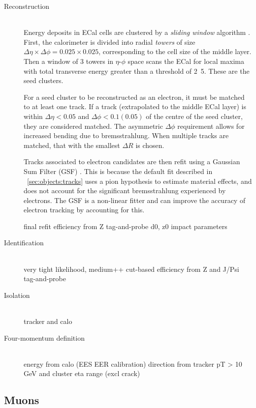 \begin{description}
\item[Reconstruction] \hfill \\
	Energy deposits in \ac{ECal} cells are clustered by a \textit{sliding window} 
	algorithm \cite{ElectronPerf:Expect}. First, the calorimeter is divided into radial 
	\textit{towers} of size $\Delta\eta \times \Delta\phi = 0.025 \times 0.025$, 
	corresponding to the cell size of the middle layer. Then a window of 3  towers
	in $\eta$-$\phi$ space scans the \ac{ECal} for local maxima with total transverse 
	energy greater than a threshold of \unit{2.5}{\GeV}. These are the seed clusters.

	For a seed cluster to be reconstructed as an electron, it must be matched to at least 
	one track. If a track (extrapolated to the middle \ac{ECal} layer) is within 
	$\Delta\eta < 0.05$ and $\Delta\phi < 0.1 (0.05)$ of the centre of the seed cluster, 
	they are considered matched. The asymmetric $\Delta\phi$ requirement allows for 
	increased bending due to bremsstrahlung. When multiple tracks are matched, that with 
	the smallest $\Delta R$ is chosen.

	Tracks associated to electron candidates are then refit using a Gaussian Sum Filter 
	(GSF) \cite{Electron:GSF}. This is because the default fit described in 
	\Section~\ref{sec:objects:tracks} uses a pion hypothesis to estimate material 
	effects, and does not account for the significant bremsstrahlung experienced by 
	electrons. The GSF is a non-linear fitter and can improve the accuracy of electron 
	tracking by accounting for this.


	final refit
	efficiency from Z tag-and-probe \cite{ElectronPerf:2010,ElectronPerf:2012}
	d0, z0 impact parameters
\item[Identification] \hfill \\
	very tight likelihood, medium++ cut-based
	efficiency from Z and J/Psi tag-and-probe \cite{ElectronPerf:2010,ElectronPerf:2012}
\item[Isolation] \hfill \\
	tracker and calo
\item[Four-momentum definition] \hfill \\
	energy from calo (EES EER calibration)
	direction from tracker
	pT > 10 GeV and cluster eta range (excl crack)
\end{description}



\subsection{Muons}
\label{sec:objects:muons}


